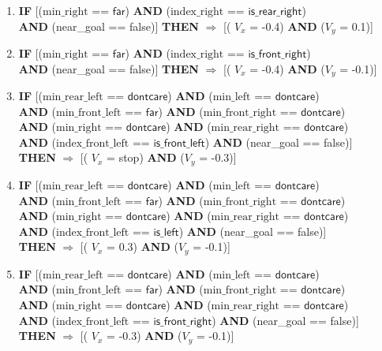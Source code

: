 \begin{enumerate}
	\item \textbf{IF} [($\text{min\_right}$ == $\textsf{far}$) \textbf{AND} ($\text{index\_right}$ == $\textsf{is\_rear\_right}$)\\
	\textbf{AND} (near\_goal == \textsf{false})]
	\textbf{THEN} $\Rightarrow$ [( $V_x$ = \textsf{-0.4}) \textbf{AND} ($V_y$ = \textsf{0.1})]
	
	\item \textbf{IF} [($\text{min\_right}$ == $\textsf{far}$) \textbf{AND} ($\text{index\_right}$ == $\textsf{is\_front\_right}$)\\
	\textbf{AND} (near\_goal == \textsf{false})]
	\textbf{THEN} $\Rightarrow$ [( $V_x$ = \textsf{-0.4}) \textbf{AND} ($V_y$ = \textsf{-0.1})]
	
	\item \textbf{IF} [($\text{min\_rear\_left}$ == $\textsf{dontcare}$) 
	\textbf{AND} ($\text{min\_left}$ == $\textsf{dontcare}$)\\
	\textbf{AND} ($\text{min\_front\_left}$ == $\textsf{far}$)
	\textbf{AND} ($\text{min\_front\_right}$ == $\textsf{dontcare}$)\\
	\textbf{AND} ($\text{min\_right}$ == $\textsf{dontcare}$) 
	\textbf{AND} ($\text{min\_rear\_right}$ == $\textsf{dontcare}$) \\
	\textbf{AND} ($\text{index\_front\_left}$ == $\textsf{is\_front\_left}$)
	\textbf{AND} (near\_goal == \textsf{false})]\\
	\textbf{THEN} $\Rightarrow$ [( $V_x$ = \textsf{stop}) \textbf{AND} ($V_y$ = \textsf{-0.3})]

	\item \textbf{IF} [($\text{min\_rear\_left}$ == $\textsf{dontcare}$) 
	\textbf{AND} ($\text{min\_left}$ == $\textsf{dontcare}$)\\
	\textbf{AND} ($\text{min\_front\_left}$ == $\textsf{far}$)
	\textbf{AND} ($\text{min\_front\_right}$ == $\textsf{dontcare}$)\\
	\textbf{AND} ($\text{min\_right}$ == $\textsf{dontcare}$) 
	\textbf{AND} ($\text{min\_rear\_right}$ == $\textsf{dontcare}$) \\
	\textbf{AND} ($\text{index\_front\_left}$ == $\textsf{is\_left}$)
	\textbf{AND} (near\_goal == \textsf{false})]\\
	\textbf{THEN} $\Rightarrow$ [( $V_x$ = \textsf{0.3}) \textbf{AND} ($V_y$ = \textsf{-0.1})]
	
	\item \textbf{IF} [($\text{min\_rear\_left}$ == $\textsf{dontcare}$) 
	\textbf{AND} ($\text{min\_left}$ == $\textsf{dontcare}$)\\
	\textbf{AND} ($\text{min\_front\_left}$ == $\textsf{far}$)
	\textbf{AND} ($\text{min\_front\_right}$ == $\textsf{dontcare}$)\\
	\textbf{AND} ($\text{min\_right}$ == $\textsf{dontcare}$) 
	\textbf{AND} ($\text{min\_rear\_right}$ == $\textsf{dontcare}$) \\
	\textbf{AND} ($\text{index\_front\_left}$ == $\textsf{is\_front\_right}$)
	\textbf{AND} (near\_goal == \textsf{false})]\\
	\textbf{THEN} $\Rightarrow$ [( $V_x$ = \textsf{-0.3}) \textbf{AND} ($V_y$ = \textsf{-0.1})]
	

\end{enumerate}
